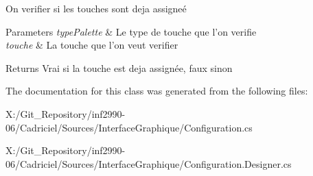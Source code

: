 On verifier si les touches sont deja assigneé 


\begin{DoxyParams}{Parameters}
{\em type\-Palette} & Le type de touche que l'on verifie\\
\hline
{\em touche} & La touche que l'on veut verifier\\
\hline
\end{DoxyParams}
\begin{DoxyReturn}{Returns}
Vrai si la touche est deja assignée, faux sinon
\end{DoxyReturn}


The documentation for this class was generated from the following files\-:\begin{DoxyCompactItemize}
\item 
X\-:/\-Git\-\_\-\-Repository/inf2990-\/06/\-Cadriciel/\-Sources/\-Interface\-Graphique/Configuration.\-cs\item 
X\-:/\-Git\-\_\-\-Repository/inf2990-\/06/\-Cadriciel/\-Sources/\-Interface\-Graphique/Configuration.\-Designer.\-cs\end{DoxyCompactItemize}

